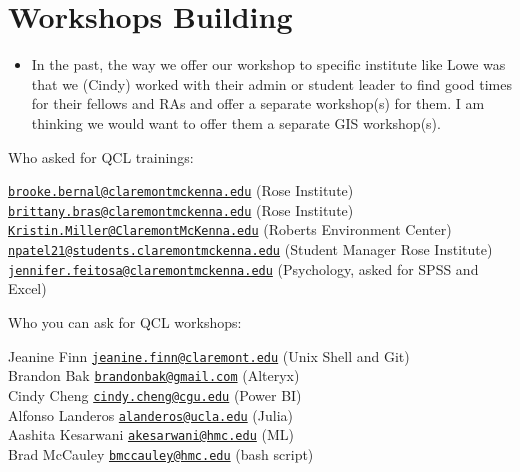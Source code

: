 \documentclass[
]{book}
\providecommand{\tightlist}{%
  \setlength{\itemsep}{0pt}\setlength{\parskip}{0pt}}
\begin{document}
\hypertarget{workshops-building}{%
\section{Workshops Building}\label{workshops-building}}

\begin{itemize}
\tightlist
\item
  In the past, the way we offer our workshop to specific institute like Lowe was that we (Cindy) worked with their admin or student leader to find good times for their fellows and RAs and offer a separate workshop(s) for them. I am thinking we would want to offer them a separate GIS workshop(s).
\end{itemize}

Who asked for QCL trainings:

\href{mailto:brooke.bernal@claremontmckenna.edu}{\nolinkurl{brooke.bernal@claremontmckenna.edu}} (Rose Institute)\\
\href{mailto:brittany.bras@claremontmckenna.edu}{\nolinkurl{brittany.bras@claremontmckenna.edu}} (Rose Institute)\\
\href{mailto:Kristin.Miller@ClaremontMcKenna.edu}{\nolinkurl{Kristin.Miller@ClaremontMcKenna.edu}} (Roberts Environment Center)\\
\href{mailto:npatel21@students.claremontmckenna.edu}{\nolinkurl{npatel21@students.claremontmckenna.edu}} (Student Manager Rose Institute)\\
\href{mailto:jennifer.feitosa@claremontmckenna.edu}{\nolinkurl{jennifer.feitosa@claremontmckenna.edu}} (Psychology, asked for SPSS and Excel)

Who you can ask for QCL workshops:

Jeanine Finn \href{mailto:jeanine.finn@claremont.edu}{\nolinkurl{jeanine.finn@claremont.edu}} (Unix Shell and Git)\\
Brandon Bak \href{mailto:brandonbak@gmail.com}{\nolinkurl{brandonbak@gmail.com}} (Alteryx)\\
Cindy Cheng \href{mailto:cindy.cheng@cgu.edu}{\nolinkurl{cindy.cheng@cgu.edu}} (Power BI)\\
Alfonso Landeros \href{mailto:alanderos@ucla.edu}{\nolinkurl{alanderos@ucla.edu}} (Julia)\\
Aashita Kesarwani \href{mailto:akesarwani@hmc.edu}{\nolinkurl{akesarwani@hmc.edu}} (ML)\\
Brad McCauley \href{mailto:bmccauley@hmc.edu}{\nolinkurl{bmccauley@hmc.edu}} (bash script)
\end{document}
